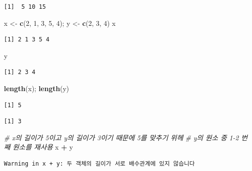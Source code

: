 \documentclass[
  11pt,
]{krantz}
\newenvironment{Shaded}{\begin{snugshade}}{\end{snugshade}}
\newcommand{\CommentTok}[1]{\textcolor[rgb]{0.37,0.37,0.37}{\textit{#1}}}
\newcommand{\DecValTok}[1]{\textcolor[rgb]{0.06,0.06,0.06}{#1}}
\newcommand{\KeywordTok}[1]{\textcolor[rgb]{0.27,0.27,0.27}{\textbf{#1}}}
\newcommand{\NormalTok}[1]{#1}
\newcommand{\OperatorTok}[1]{\textcolor[rgb]{0.43,0.43,0.43}{\textbf{#1}}}
\newcommand{\StringTok}[1]{\textcolor[rgb]{0.5,0.5,0.5}{#1}}
\begin{document}
\begin{verbatim}
[1]  5 10 15
\end{verbatim}

\begin{Shaded}
\begin{Highlighting}[]
\NormalTok{x <-}\StringTok{ }\KeywordTok{c}\NormalTok{(}\DecValTok{2}\NormalTok{, }\DecValTok{1}\NormalTok{, }\DecValTok{3}\NormalTok{, }\DecValTok{5}\NormalTok{, }\DecValTok{4}\NormalTok{); y <-}\StringTok{ }\KeywordTok{c}\NormalTok{(}\DecValTok{2}\NormalTok{, }\DecValTok{3}\NormalTok{, }\DecValTok{4}\NormalTok{)}
\NormalTok{x}
\end{Highlighting}
\end{Shaded}

\begin{verbatim}
[1] 2 1 3 5 4
\end{verbatim}

\begin{Shaded}
\begin{Highlighting}[]
\NormalTok{y}
\end{Highlighting}
\end{Shaded}

\begin{verbatim}
[1] 2 3 4
\end{verbatim}

\begin{Shaded}
\begin{Highlighting}[]
\KeywordTok{length}\NormalTok{(x); }\KeywordTok{length}\NormalTok{(y)}
\end{Highlighting}
\end{Shaded}

\begin{verbatim}
[1] 5
\end{verbatim}

\begin{verbatim}
[1] 3
\end{verbatim}

\begin{Shaded}
\begin{Highlighting}[]
\CommentTok{# x의 길이가 5이고 y의 길이가 3이기 때문에 5를 맞추기 위헤}
\CommentTok{# y의 원소 중 1-2 번째 원소를 재사용}
\NormalTok{x }\OperatorTok{+}\StringTok{ }\NormalTok{y}
\end{Highlighting}
\end{Shaded}

\begin{verbatim}
Warning in x + y: 두 객체의 길이가 서로 배수관계에 있지 않습니다
\end{verbatim}
\end{document}
